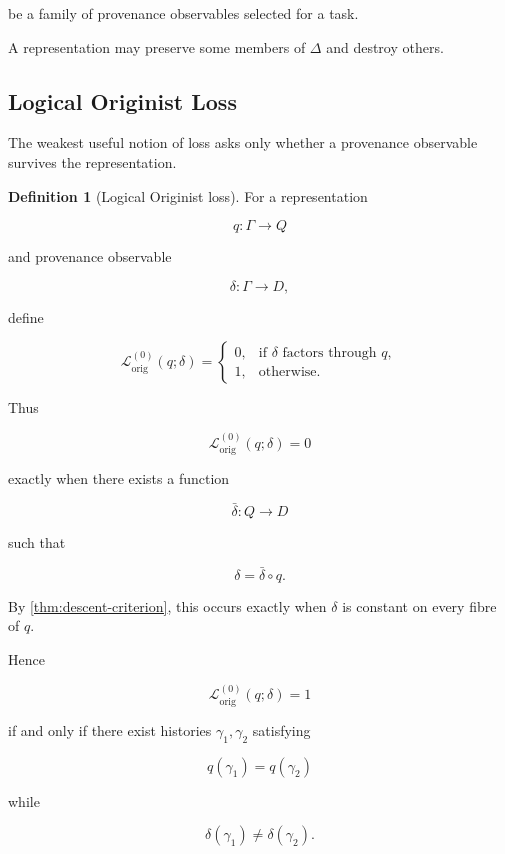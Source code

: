\documentclass[
  11pt,
  a4paper,
  DIV=12,
  BCOR=0mm,
  parskip=half-
]{scrartcl}
\newcommand{\lossorig}{%
  \mathscr L_{\mathrm{orig}}%
}
\theoremstyle{definition}
\newtheorem{definition}{Definition}[section]
\theoremstyle{plain}
\theoremstyle{remark}
\begin{document}
be a family of provenance observables selected for a task.

A representation may preserve some members of \(\Delta\) and destroy others.


\subsection{Logical Originist Loss}
\label{app:logical-originist-loss}

The weakest useful notion of loss asks only whether a provenance observable
survives the representation.

\begin{definition}[Logical Originist loss]
\label{def:logical-originist-loss}
For a representation

\[
  q:\Gamma\to Q
\]

and provenance observable

\[
  \delta:\Gamma\to D,
\]

define

\[
  \lossorig^{(0)}(q;\delta)
  =
  \begin{cases}
    0,
      & \text{if }\delta\text{ factors through }q,\\[4pt]
    1,
      & \text{otherwise.}
  \end{cases}
\]
\end{definition}

Thus

\[
  \lossorig^{(0)}(q;\delta)=0
\]

exactly when there exists a function

\[
  \bar\delta:Q\to D
\]

such that

\[
  \delta=\bar\delta\circ q.
\]

By \cref{thm:descent-criterion}, this occurs exactly when \(\delta\) is
constant on every fibre of \(q\).

Hence

\[
  \lossorig^{(0)}(q;\delta)=1
\]

if and only if there exist histories \(\gamma_1,\gamma_2\) satisfying

\[
  q(\gamma_1)=q(\gamma_2)
\]

while

\[
  \delta(\gamma_1)\neq\delta(\gamma_2).
\]
\end{document}
